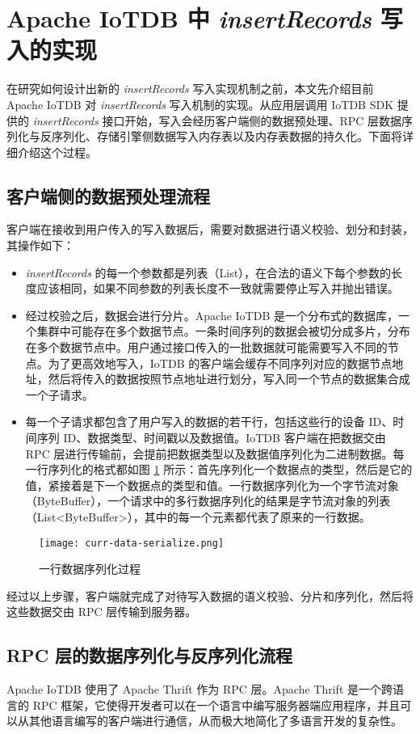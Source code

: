 \section{Apache IoTDB 中 \emph{insertRecords} 写入的实现\label{sec:chap3-sec2}}
在研究如何设计出新的 \emph{insertRecords} 写入实现机制之前，本文先介绍目前 Apache IoTDB 对 \emph{insertRecords} 写入机制的实现。从应用层调用 IoTDB SDK 提供的 \emph{insertRecords} 接口开始，写入会经历客户端侧的数据预处理、RPC 层数据序列化与反序列化、存储引擎侧数据写入内存表以及内存表数据的持久化。下面将详细介绍这个过程。
\subsection{客户端侧的数据预处理流程}
客户端在接收到用户传入的写入数据后，需要对数据进行语义校验、划分和封装，其操作如下：
\begin{itemize}
  \item \emph{insertRecords} 的每一个参数都是列表（List），在合法的语义下每个参数的长度应该相同，如果不同参数的列表长度不一致就需要停止写入并抛出错误。
  \item 经过校验之后，数据会进行分片。Apache IoTDB 是一个分布式的数据库，一个集群中可能存在多个数据节点。一条时间序列的数据会被切分成多片，分布在多个数据节点中\cite{wang2023apache}。用户通过接口传入的一批数据就可能需要写入不同的节点。为了更高效地写入，IoTDB 的客户端会缓存不同序列对应的数据节点地址，然后将传入的数据按照节点地址进行划分，写入同一个节点的数据集合成一个子请求。
  \item 每一个子请求都包含了用户写入的数据的若干行，包括这些行的设备 ID、时间序列 ID、数据类型、时间戳以及数据值。IoTDB 客户端在把数据交由 RPC 层进行传输前，会提前把数据类型以及数据值序列化为二进制数据。每一行序列化的格式都如图 \ref{fig:curr-line-serialize-format} 所示：首先序列化一个数据点的类型，然后是它的值，紧接着是下一个数据点的类型和值。一行数据序列化为一个字节流对象（ByteBuffer），一个请求中的多行数据序列化的结果是字节流对象的列表（List<ByteBuffer>），其中的每一个元素都代表了原来的一行数据。
\end{itemize}

\begin{figure}
  \centering
  \texttt{[image: curr-data-serialize.png]}
  \caption{一行数据序列化过程}
  \label{fig:curr-line-serialize-format}
\end{figure}

经过以上步骤，客户端就完成了对待写入数据的语义校验、分片和序列化，然后将这些数据交由 RPC 层传输到服务器。
\subsection{RPC 层的数据序列化与反序列化流程}
Apache IoTDB 使用了 Apache Thrift\cite{apache2024thrift} 作为 RPC 层。Apache Thrift 是一个跨语言的 RPC 框架，它使得开发者可以在一个语言中编写服务器端应用程序，并且可以从其他语言编写的客户端进行通信，从而极大地简化了多语言开发的复杂性。


